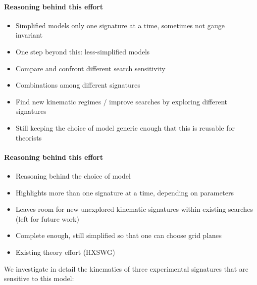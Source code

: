 \paragraph{Reasoning behind this effort}

\begin{itemize}
\item Simplified models only one signature at a time, sometimes not
gauge invariant
\item One step beyond this: less-simplified models

\item Compare and confront different search sensitivity

\item Combinations among different signatures

\item Find new kinematic regimes / improve searches by exploring
different signatures

\item Still keeping the choice of model generic enough that this is reusable
for theorists

\end{itemize}

\paragraph{Reasoning behind this effort}

\begin{itemize}

\item Reasoning behind the choice of model

\item Highlights more than one signature at a time, depending on
parameters

\item Leaves room for new unexplored kinematic signatures within
existing searches (left for future work)

\item Complete enough, still simplified so that one can choose grid
planes

\item Existing theory effort (HXSWG)
\end{itemize}

We investigate in detail the kinematics of three experimental signatures that are sensitive to this model: 

